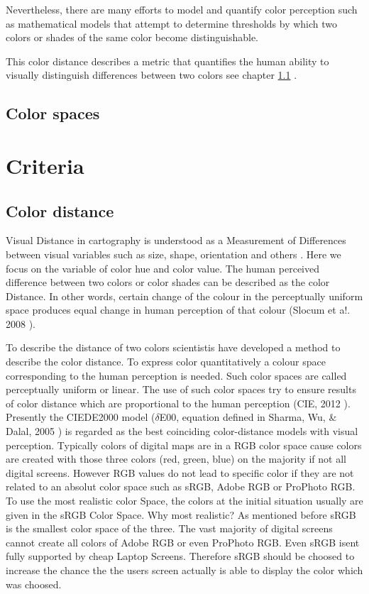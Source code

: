 Nevertheless, there are many efforts to model and quantify color perception such as mathematical models that attempt to determine thresholds by which two colors or shades of the same color become distinguishable. 

This color distance describes a metric that quantifies the human ability to visually distinguish differences between two colors see chapter \ref{subsection:distance} \parencite{coltekin2017}.

\subsection{Color spaces}

\section{Criteria}

\subsection{Color distance}\label{subsection:distance}
Visual Distance in cartography is understood as a Measurement of Differences between visual variables such as size, shape, orientation and others \parencite{brychtova2015}. Here we focus on the variable of color hue and color value. The human perceived difference between two colors or color shades can be described as the color Distance. In other words, certain change of the colour in the perceptually uniform space produces equal change in human perception of that colour (Slocum et a!. 2008 \parencite{brychtova2017}).

To describe the distance of two colors scientistis have developed a method to describe the color distance. To express color quantitatively a colour space corresponding to the human perception is needed. Such color spaces are called perceptually uniform or linear. The use of such color spaces try to ensure results of color distance which are proportional to the human perception (CIE, 2012 \parencite{brychtova2015}). Presently the CIEDE2000 model ($\delta$E00, equation defined in Sharma, Wu, \& Dalal, 2005 \parencite{brychtova2015}) is regarded as the best coinciding color-distance models with visual perception. 
Typically colors of digital maps are in a RGB color space cause colors are created with those three colors (red, green, blue) on the majority if not all digital screens. However RGB values do not lead to specific color if they are not related to an absolut color space such as sRGB, Adobe RGB or ProPhoto RGB. To use the most realistic color Space, the colors at the initial situation usually are given in the sRGB Color Space. Why most realistic? As mentioned before sRGB is the smallest color space of the three. The vast majority of digital screens cannot create all colors of Adobe RGB or even ProPhoto RGB. Even sRGB isent fully supported by cheap Laptop Screens. Therefore sRGB should be choosed to increase the chance the the users screen actually is able to display the color which was choosed. 

